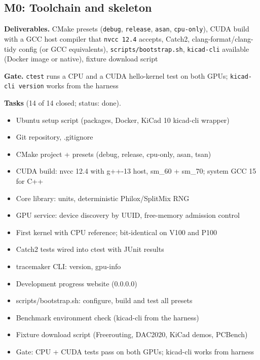 \subsection*{M0: Toolchain and skeleton}
\noindent\textbf{Deliverables.} CMake presets (\texttt{debug}, \texttt{release}, \texttt{asan}, \texttt{cpu-only}), CUDA build with a GCC host compiler that \texttt{nvcc 12.4} accepts, Catch2, clang-format/clang-tidy config (or GCC equivalents), \texttt{scripts/bootstrap.sh}, \texttt{kicad-cli} available (Docker image or native), fixture download script\par\smallskip
\noindent\textbf{Gate.} \texttt{ctest} runs a CPU and a CUDA hello-kernel test on both GPUs; \texttt{kicad-cli version} works from the harness\par\smallskip
\noindent\textbf{Tasks} (14 of 14 closed; status: done).
\begin{itemize}[leftmargin=1.6em,itemsep=1pt]
\item[\textcolor{fraqua}{$\checkmark$}] Ubuntu setup script (packages, Docker, KiCad 10 kicad-cli wrapper)
\item[\textcolor{fraqua}{$\checkmark$}] Git repository, .gitignore
\item[\textcolor{fraqua}{$\checkmark$}] CMake project + presets (debug, release, cpu-only, asan, tsan)
\item[\textcolor{fraqua}{$\checkmark$}] CUDA build: nvcc 12.4 with g++-13 host, sm\_60 + sm\_70; system GCC 15 for C++
\item[\textcolor{fraqua}{$\checkmark$}] Core library: units, deterministic Philox/SplitMix RNG
\item[\textcolor{fraqua}{$\checkmark$}] GPU service: device discovery by UUID, free-memory admission control
\item[\textcolor{fraqua}{$\checkmark$}] First kernel with CPU reference; bit-identical on V100 and P100
\item[\textcolor{fraqua}{$\checkmark$}] Catch2 tests wired into ctest with JUnit results
\item[\textcolor{fraqua}{$\checkmark$}] tracemaker CLI: version, gpu-info
\item[\textcolor{fraqua}{$\checkmark$}] Development progress website (0.0.0.0)
\item[\textcolor{fraqua}{$\checkmark$}] scripts/bootstrap.sh: configure, build and test all presets
\item[\textcolor{fraqua}{$\checkmark$}] Benchmark environment check (kicad-cli from the harness)
\item[\textcolor{fraqua}{$\checkmark$}] Fixture download script (Freerouting, DAC2020, KiCad demos, PCBench)
\item[\textcolor{fraqua}{$\checkmark$}] Gate: CPU + CUDA tests pass on both GPUs; kicad-cli works from harness
\end{itemize}
